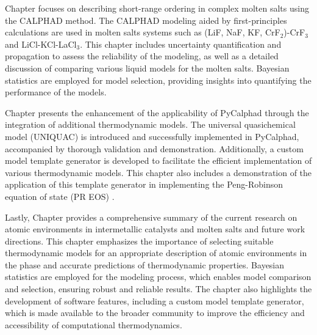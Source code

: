 Chapter  focuses on describing short-range ordering in complex molten salts using the CALPHAD method. The CALPHAD modeling aided by first-principles calculations are used in molten salts systems such as (LiF, NaF, KF, CrF$_2$)-CrF$_3$ and LiCl-KCl-LaCl$_3$. This chapter includes uncertainty quantification and propagation to assess the reliability of the modeling, as well as a detailed discussion of comparing various liquid models for the molten salts. Bayesian statistics are employed for model selection, providing insights into quantifying the performance of the models.

Chapter  presents the enhancement of the applicability of PyCalphad through the integration of additional thermodynamic models. The universal quasichemical model (UNIQUAC) \cite{abrams1975statistical} is introduced and successfully implemented in PyCalphad, accompanied by thorough validation and demonstration. Additionally, a custom model template generator is developed to facilitate the efficient implementation of various thermodynamic models. This chapter also includes a demonstration of the application of this template generator in implementing the Peng-Robinson equation of state (PR EOS) \cite{peng1976new}.

Lastly, Chapter  provides a comprehensive summary of the current research on atomic environments in intermetallic catalysts and molten salts and future work directions. This chapter emphasizes the importance of selecting suitable thermodynamic models for an appropriate description of atomic environments in the phase and accurate predictions of thermodynamic properties. Bayesian statistics are employed for the modeling process, which enables model comparison and selection, ensuring robust and reliable results. The chapter also highlights the development of software features, including a custom model template generator, which is made available to the broader community to improve the efficiency and accessibility of computational thermodynamics.